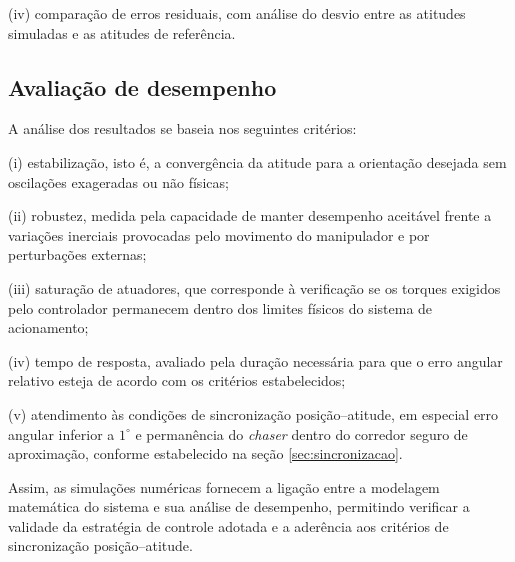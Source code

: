 (iv) comparação de erros residuais, com análise do desvio entre as atitudes simuladas e as atitudes de referência.

\subsection{Avaliação de desempenho}
A análise dos resultados se baseia nos seguintes critérios:

(i) estabilização, isto é, a convergência da atitude para a orientação desejada sem oscilações exageradas ou não físicas;

(ii) robustez, medida pela capacidade de manter desempenho aceitável frente a variações inerciais provocadas pelo movimento do manipulador e por perturbações externas;

(iii) saturação de atuadores, que corresponde à verificação se os torques exigidos pelo controlador permanecem dentro dos limites físicos do sistema de acionamento;

(iv) tempo de resposta, avaliado pela duração necessária para que o erro angular relativo esteja de acordo com os critérios estabelecidos;

(v) atendimento às condições de sincronização posição--atitude, em especial erro angular inferior a $1^\circ$ e permanência do \emph{chaser} dentro do corredor seguro de aproximação, conforme estabelecido na seção \eqref{sec:sincronizacao}.

Assim, as simulações numéricas fornecem a ligação entre a modelagem matemática do sistema e sua análise de desempenho, permitindo verificar a validade da estratégia de controle adotada e a aderência aos critérios de sincronização posição--atitude.
